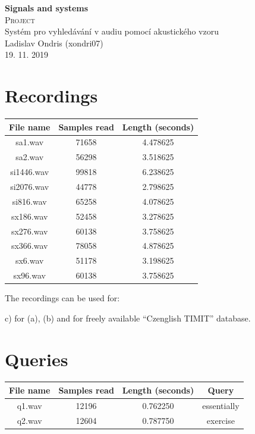 \documentclass[11pt]{article}
\begin{document}
\begin{titlepage}
\center


\textbf{\Huge{Signals and systems}}
\\[4.0cm]

\textsc{\Huge {Project}}
\\[0.2cm]

\Large {Systém pro vyhledávání v audiu pomocí akustického vzoru}
\\[3.0cm]

\Large{Ladislav Ondris (xondri07)}
\\[0.7cm]
\Large{19. 11. 2019}

\end{titlepage}

\newpage

\section{Recordings}
\par

\begin{center}
\begin{tabular}{ |c|c|c| } 
 \hline
 File name & Samples read & Length (seconds) \\ 
 \hline
 sa1.wav &  71658 & 4.478625 \\ 
 sa2.wav & 56298 & 3.518625 \\ 
 si1446.wav & 99818 & 6.238625 \\ 
 si2076.wav & 44778 & 2.798625 \\ 
 si816.wav & 65258 & 4.078625 \\ 
 sx186.wav & 52458 & 3.278625 \\ 
 sx276.wav & 60138 & 3.758625 \\ 
 sx366.wav & 78058 & 4.878625 \\ 
 sx6.wav & 51178 &  3.198625 \\ 
 sx96.wav & 60138 & 3.758625 \\ 
 \hline
\end{tabular}
\end{center}
\par 
The recordings can be used for: 
\par
c) for (a), (b) and for freely available “Czenglish TIMIT” database. 

\section{Queries}
\begin{center}
\begin{tabular}{ |c|c|c|c| } 
 \hline
 File name & Samples read & Length (seconds) & Query \\ 
 \hline
 q1.wav &  12196 & 0.762250 & essentially \\ 
 q2.wav & 12604 & 0.787750 & exercise \\ 
 \hline
\end{tabular}
\end{center}
\end{document}
